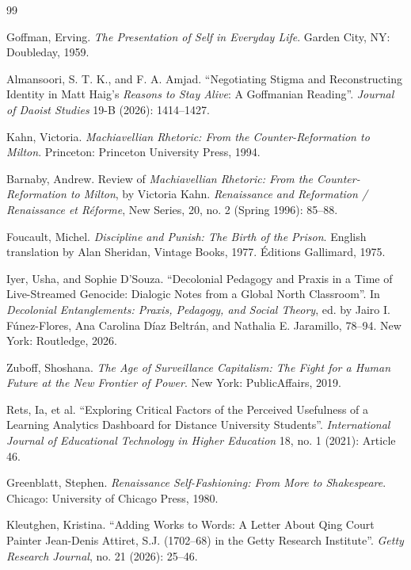 \documentclass[10pt]{article}
\begin{document}
\begin{thebibliography}{99}
\setlength{\itemsep}{0.6em}

 Goffman, Erving. \emph{The Presentation of Self in Everyday Life}. Garden City, NY: Doubleday, 1959.

 Almansoori, S. T. K., and F. A. Amjad. ``Negotiating Stigma and Reconstructing Identity in Matt Haig's \emph{Reasons to Stay Alive}: A Goffmanian Reading''. \emph{Journal of Daoist Studies} 19-B (2026): 1414--1427.

 Kahn, Victoria. \emph{Machiavellian Rhetoric: From the Counter-Reformation to Milton}. Princeton: Princeton University Press, 1994.

 Barnaby, Andrew. Review of \emph{Machiavellian Rhetoric: From the Counter-Reformation to Milton}, by Victoria Kahn. \emph{Renaissance and Reformation / Renaissance et R\'eforme}, New Series, 20, no. 2 (Spring 1996): 85--88.

 Foucault, Michel. \emph{Discipline and Punish: The Birth of the Prison}. English translation by Alan Sheridan, Vintage Books, 1977. \'Editions Gallimard, 1975.

 Iyer, Usha, and Sophie D'Souza. ``Decolonial Pedagogy and Praxis in a Time of Live-Streamed Genocide: Dialogic Notes from a Global North Classroom''. In \emph{Decolonial Entanglements: Praxis, Pedagogy, and Social Theory}, ed. by Jairo I. F\'unez-Flores, Ana Carolina D\'iaz Beltr\'an, and Nathalia E. Jaramillo, 78--94. New York: Routledge, 2026.

 Zuboff, Shoshana. \emph{The Age of Surveillance Capitalism: The Fight for a Human Future at the New Frontier of Power}. New York: PublicAffairs, 2019.

 Rets, Ia, et al. ``Exploring Critical Factors of the Perceived Usefulness of a Learning Analytics Dashboard for Distance University Students''. \emph{International Journal of Educational Technology in Higher Education} 18, no. 1 (2021): Article 46.

 Greenblatt, Stephen. \emph{Renaissance Self-Fashioning: From More to Shakespeare}. Chicago: University of Chicago Press, 1980.

 Kleutghen, Kristina. ``Adding Works to Words: A Letter About Qing Court Painter Jean-Denis Attiret, S.J. (1702--68) in the Getty Research Institute''. \emph{Getty Research Journal}, no. 21 (2026): 25--46.


\end{thebibliography}
\end{document}

